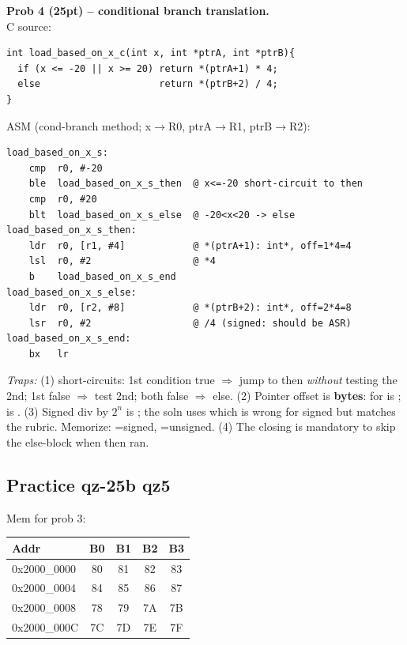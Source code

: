 \begin{qp}\textbf{Prob 4 (25pt) -- conditional branch translation.}\\
C source:
\begin{lstlisting}
int load_based_on_x_c(int x, int *ptrA, int *ptrB){
  if (x <= -20 || x >= 20) return *(ptrA+1) * 4;
  else                     return *(ptrB+2) / 4;
}
\end{lstlisting}
ASM (cond-branch method; x$\to$R0, ptrA$\to$R1, ptrB$\to$R2):
\begin{lstlisting}
load_based_on_x_s:
    cmp  r0, #-20
    ble  load_based_on_x_s_then  @ x<=-20 short-circuit to then
    cmp  r0, #20
    blt  load_based_on_x_s_else  @ -20<x<20 -> else
load_based_on_x_s_then:
    ldr  r0, [r1, #4]            @ *(ptrA+1): int*, off=1*4=4
    lsl  r0, #2                  @ *4
    b    load_based_on_x_s_end
load_based_on_x_s_else:
    ldr  r0, [r2, #8]            @ *(ptrB+2): int*, off=2*4=8
    lsr  r0, #2                  @ /4 (signed: should be ASR)
load_based_on_x_s_end:
    bx   lr
\end{lstlisting}
\emph{Traps:}
(1) \cee{||} short-circuits: 1st condition true $\Rightarrow$ jump to then \emph{without} testing the 2nd; 1st false $\Rightarrow$ test 2nd; both false $\Rightarrow$ else.
(2) Pointer offset is \textbf{bytes}:  for  is ;  is .
(3) Signed div by $2^n$ is ; the soln uses  which is wrong for signed but matches the rubric. Memorize: =signed, =unsigned.
(4) The closing  is mandatory to skip the else-block when then ran.
\end{qp}

\subsection{Practice qz-25b qz5}
Mem for prob 3:
\begin{center}\scriptsize
\begin{tabular}{@{}lcccc@{}}
\toprule
Addr & B0 & B1 & B2 & B3 \\
\midrule
0x2000\_0000 & 80 & 81 & 82 & 83 \\
0x2000\_0004 & 84 & 85 & 86 & 87 \\
0x2000\_0008 & 78 & 79 & 7A & 7B \\
0x2000\_000C & 7C & 7D & 7E & 7F \\
\bottomrule
\end{tabular}
\end{center}

